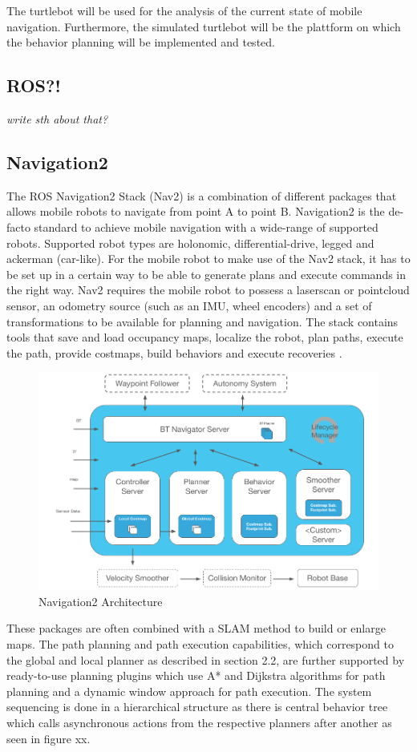 The turtlebot will be used for the analysis of the current state of mobile navigation. Furthermore, the simulated turtlebot will be the plattform on which the behavior planning will be implemented and tested.

\subsection{ROS?!}
\textit{write sth about that?}

\subsection{Navigation2}
The ROS Navigation2 Stack (Nav2) is a combination of different packages that allows mobile robots to navigate from point A to point B. Navigation2 is the de-facto standard to achieve mobile navigation with a wide-range of supported robots. Supported robot types are holonomic, differential-drive, legged and ackerman (car-like). For the mobile robot to make use of the Nav2 stack, it has to be set up in a certain way to be able to generate plans and execute commands in the right way. Nav2 requires the mobile robot to possess a laserscan or pointcloud sensor, an odometry source (such as an IMU, wheel encoders) and a set of transformations to be available for planning and navigation. 
The stack contains tools that save and load occupancy maps, localize the robot, plan paths, execute the path, provide costmaps, build behaviors and execute recoveries \cite{macenski2020}. 

\begin{figure}[h!]
	\includegraphics[width=1.0\textwidth]{images/nav2_architecture.png}
	\caption{Navigation2 Architecture \cite{macenski2020}}
\end{figure}
These packages are often combined with a SLAM method to build or enlarge maps. The path planning and path execution capabilities, which correspond to the global and local planner as described in section 2.2, are further supported by ready-to-use planning plugins which use A* and Dijkstra algorithms for path planning and a dynamic window approach for path execution. The system sequencing is done in a hierarchical structure as there is central behavior tree which calls asynchronous actions from the respective planners after another as seen in figure xx. 

